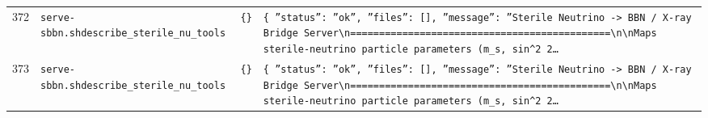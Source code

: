 \documentclass[11pt,a4paper]{article}
\begin{document}
\begin{longtable}{@{}p{}p{}p{}p{}@{}}
372 & \texttt{serve-sbbn.sh}\newline\texttt{describe\_\allowbreak{}sterile\_\allowbreak{}nu\_\allowbreak{}tools} & \texttt{\{\}\allowbreak{}} & \texttt{\{   ''status'':\allowbreak{} ''ok'',\allowbreak{}   ''files'':\allowbreak{} []\allowbreak{},\allowbreak{}   ''message'':\allowbreak{} ''Sterile Neutrino -\textgreater{}\allowbreak{} BBN /\allowbreak{} X-ray Bridge Server\textbackslash{}\allowbreak{}n=\allowbreak{}=\allowbreak{}=\allowbreak{}=\allowbreak{}=\allowbreak{}=\allowbreak{}=\allowbreak{}=\allowbreak{}=\allowbreak{}=\allowbreak{}=\allowbreak{}=\allowbreak{}=\allowbreak{}=\allowbreak{}=\allowbreak{}=\allowbreak{}=\allowbreak{}=\allowbreak{}=\allowbreak{}=\allowbreak{}=\allowbreak{}=\allowbreak{}=\allowbreak{}=\allowbreak{}=\allowbreak{}=\allowbreak{}=\allowbreak{}=\allowbreak{}=\allowbreak{}=\allowbreak{}=\allowbreak{}=\allowbreak{}=\allowbreak{}=\allowbreak{}=\allowbreak{}=\allowbreak{}=\allowbreak{}=\allowbreak{}=\allowbreak{}=\allowbreak{}=\allowbreak{}=\allowbreak{}=\allowbreak{}=\allowbreak{}=\allowbreak{}\textbackslash{}\allowbreak{}n\textbackslash{}\allowbreak{}nMaps sterile-neutrino particle parameters (m\_\allowbreak{}s,\allowbreak{} sin\textasciicircum{}\allowbreak{}2 2\ldots{}\allowbreak{}} \\
373 & \texttt{serve-sbbn.sh}\newline\texttt{describe\_\allowbreak{}sterile\_\allowbreak{}nu\_\allowbreak{}tools} & \texttt{\{\}\allowbreak{}} & \texttt{\{   ''status'':\allowbreak{} ''ok'',\allowbreak{}   ''files'':\allowbreak{} []\allowbreak{},\allowbreak{}   ''message'':\allowbreak{} ''Sterile Neutrino -\textgreater{}\allowbreak{} BBN /\allowbreak{} X-ray Bridge Server\textbackslash{}\allowbreak{}n=\allowbreak{}=\allowbreak{}=\allowbreak{}=\allowbreak{}=\allowbreak{}=\allowbreak{}=\allowbreak{}=\allowbreak{}=\allowbreak{}=\allowbreak{}=\allowbreak{}=\allowbreak{}=\allowbreak{}=\allowbreak{}=\allowbreak{}=\allowbreak{}=\allowbreak{}=\allowbreak{}=\allowbreak{}=\allowbreak{}=\allowbreak{}=\allowbreak{}=\allowbreak{}=\allowbreak{}=\allowbreak{}=\allowbreak{}=\allowbreak{}=\allowbreak{}=\allowbreak{}=\allowbreak{}=\allowbreak{}=\allowbreak{}=\allowbreak{}=\allowbreak{}=\allowbreak{}=\allowbreak{}=\allowbreak{}=\allowbreak{}=\allowbreak{}=\allowbreak{}=\allowbreak{}=\allowbreak{}=\allowbreak{}=\allowbreak{}=\allowbreak{}\textbackslash{}\allowbreak{}n\textbackslash{}\allowbreak{}nMaps sterile-neutrino particle parameters (m\_\allowbreak{}s,\allowbreak{} sin\textasciicircum{}\allowbreak{}2 2\ldots{}\allowbreak{}} \\

\end{longtable}
\end{document}
